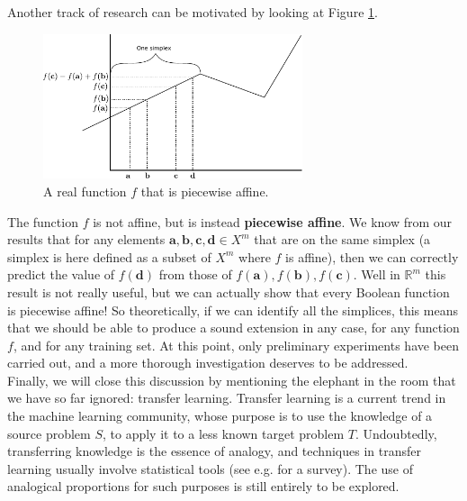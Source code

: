 Another track of research can be motivated by looking at Figure
\ref{FIG:piecewise_affine}.
\begin{figure}[!h]
\centering
  \includegraphics[width=3in]{figures/piecewise_affine.pdf}
  \caption{A real function $f$ that is piecewise affine.}
\label{FIG:piecewise_affine}
\end{figure}
The function $f$ is not affine, but is instead \textbf{piecewise affine}. We
know from our results that for any elements $\mathbf{a}, \mathbf{b},
\mathbf{c}, \mathbf{d} \in X^m$ that are on the same simplex (a simplex is here
defined as a subset of $X^m$ where $f$ is affine), then we can correctly
predict the value of $f(\mathbf{d})$ from those of $f(\mathbf{a}),
f(\mathbf{b}), f(\mathbf{c})$. Well in $\mathbb{R}^m$ this result is not really
useful, but we can actually show that every Boolean function is piecewise
affine! So theoretically, if we can identify all the simplices, this means that
we should be able to produce a sound extension in any case, for any function
$f$, and for any training set. At this point, only preliminary experiments
have been carried out, and a more thorough investigation deserves to be
addressed.\\

Finally, we will close this discussion by mentioning the elephant in the room
that we have so far ignored: transfer learning. Transfer learning is a current
trend in the machine learning community, whose purpose is to use the knowledge
of a source problem $S$, to apply it to a less known target problem $T$.
Undoubtedly, transferring knowledge is the essence of analogy, and techniques
in transfer learning usually involve statistical tools (see e.g.
\cite{PanYanTKDE10} for a survey). The use of analogical proportions for such
purposes is still entirely to be explored.
